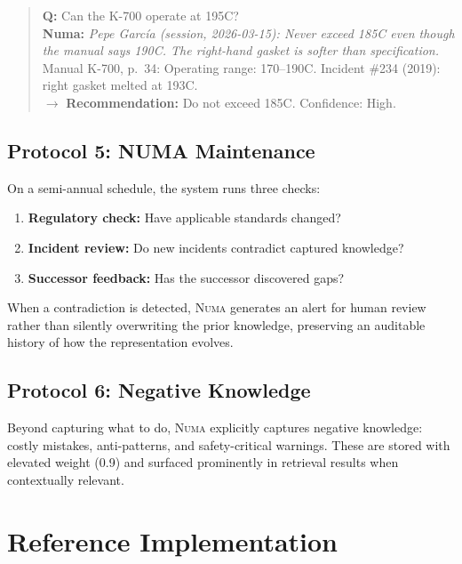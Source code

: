 \documentclass[11pt,a4paper]{article}
\begin{document}
\begin{quote}
\small
\textbf{Q:} Can the K-700 operate at 195\textdegree C?\\
\textbf{Numa:} {\it Pepe Garc\'ia (session, 2026-03-15): Never exceed 185\textdegree C even though the manual says 190\textdegree C. The right-hand gasket is softer than specification.} Manual K-700, p.~34: Operating range: 170--190\textdegree C. Incident \#234 (2019): right gasket melted at 193\textdegree C.\\
$\rightarrow$ \textbf{Recommendation:} Do not exceed 185\textdegree C. Confidence: High.
\end{quote}

\subsection{Protocol 5: NUMA Maintenance}

On a semi-annual schedule, the system runs three checks:

\begin{enumerate}
    \item \textbf{Regulatory check:} Have applicable standards changed?
    \item \textbf{Incident review:} Do new incidents contradict captured knowledge?
    \item \textbf{Successor feedback:} Has the successor discovered gaps?
\end{enumerate}

When a contradiction is detected, \textsc{Numa} generates an alert for human review rather than silently overwriting the prior knowledge, preserving an auditable history of how the representation evolves.

\subsection{Protocol 6: Negative Knowledge}

Beyond capturing what to do, \textsc{Numa} explicitly captures negative knowledge: costly mistakes, anti-patterns, and safety-critical warnings. These are stored with elevated weight (0.9) and surfaced prominently in retrieval results when contextually relevant.

\section{Reference Implementation}
\end{document}

